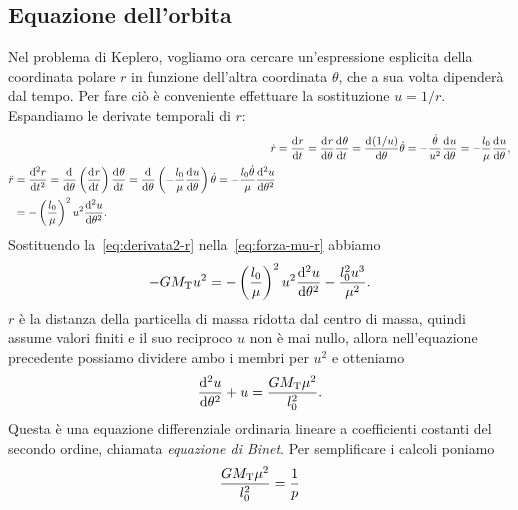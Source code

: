 \subsection{Equazione dell'orbita}
\label{sec:equazione-dellorbita}

Nel problema di Keplero, vogliamo ora cercare un'espressione esplicita della
coordinata polare $r$ in funzione dell'altra coordinata $\theta$, che a sua
volta dipenderà dal tempo. Per fare ciò è conveniente effettuare la sostituzione
$u=1/r$. Espandiamo le derivate temporali di $r$:
\begin{subequations}
  \begin{align}
    \dot{r} &= \toder{r}{t} = \toder{r}{\theta}\toder{\theta}{t} =
    \toder{(1/u)}{\theta}\dot{\theta} =
    -\frac{\dot{\theta}}{u^2}\toder{u}{\theta}
    = -\frac{l_0}{\mu}\toder{u}{\theta}, \label{eq:derivata1-r}\\
    \begin{split}
      \ddot{r} &= \toder[2]{r}{t} = \toder{}{\theta} \left( \toder{r}{t}
      \right)\toder{\theta}{t} = \toder{}{\theta} \left(
        -\frac{l_0}{\mu}\toder{u}{\theta} \right)\dot{\theta} =
      -\frac{l_0\dot{\theta}}{\mu}\toder[2]{u}{\theta} \\
      &= - \left(
        \frac{l_0}{\mu} \right)^2u^2\toder[2]{u}{\theta}. \label{eq:derivata2-r}
    \end{split}
  \end{align}
\end{subequations}
Sostituendo la~\eqref{eq:derivata2-r} nella~\eqref{eq:forza-mu-r} abbiamo
\begin{equation}
  -GM_\textup{T}u^2 = -\left(
        \frac{l_0}{\mu} \right)^2u^2\toder[2]{u}{\theta} - \frac{l_0^2u^3}{\mu^2}.
\end{equation}
$r$ è la distanza della particella di massa ridotta dal centro di massa, quindi
assume valori finiti e il suo reciproco $u$ non è mai nullo, allora
nell'equazione precedente possiamo dividere ambo i membri per $u^2$ e otteniamo
\begin{equation}
  \toder[2]{u}{\theta} + u = \frac{GM_\textup{T}\mu^2}{l_0^2}.
\end{equation}
Questa è una equazione differenziale ordinaria lineare a coefficienti costanti
del secondo ordine, chiamata \emph{equazione di Binet}. Per semplificare i
calcoli poniamo
\begin{equation}
  \label{eq:rec-semilato}
  \frac{GM_\textup{T}\mu^2}{l_0^2} = \frac{1}{p}
\end{equation}
